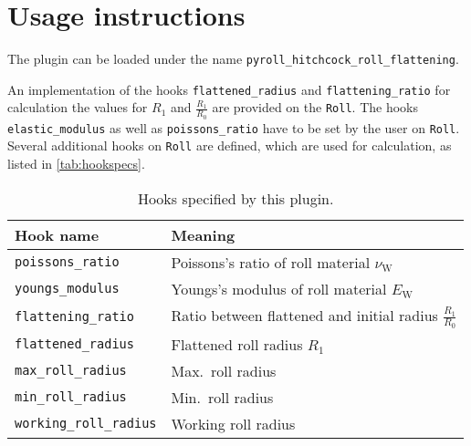 \documentclass[11pt]{PyRollDocs}
\begin{document}
    \section{Usage instructions}\label{sec:usage-instructions}

    The plugin can be loaded under the name \texttt{pyroll\_hitchcock\_roll\_flattening}.

    An implementation of the hooks \lstinline{flattened_radius} and \lstinline{flattening_ratio}
    for calculation the values for $R_1$ and $\frac{R_1}{R_0}$ are provided on the \lstinline{Roll}.
    The hooks \lstinline{elastic_modulus} as well as \lstinline{poissons_ratio} have to be set by the user on \lstinline{Roll}.
    Several additional hooks on \lstinline{Roll} are defined, which are used for calculation, as listed in \autoref{tab:hookspecs}.

    \begin{table}
        \centering
        \caption{Hooks specified by this plugin.}
        \label{tab:hookspecs}
        \begin{tabular}{ll}
            \toprule
            Hook name                      & Meaning                                                      \\
            \midrule
            \texttt{poissons\_ratio}       & Poissons's ratio of roll material $\nu_\mathrm{W}$           \\
            \texttt{youngs\_modulus}       & Youngs's modulus of roll material $E_\mathrm{W}$             \\
            \texttt{flattening\_ratio}     & Ratio between flattened and initial radius $\frac{R_1}{R_0}$ \\
            \texttt{flattened\_radius}     & Flattened roll radius $R_1$                                  \\
            \texttt{max\_roll\_radius}     & Max.~roll radius                                             \\
            \texttt{min\_roll\_radius}     & Min.~roll radius                                             \\
            \texttt{working\_roll\_radius} & Working roll radius                                          \\
            \bottomrule
        \end{tabular}
    \end{table}

    \printbibliography
\end{document}
